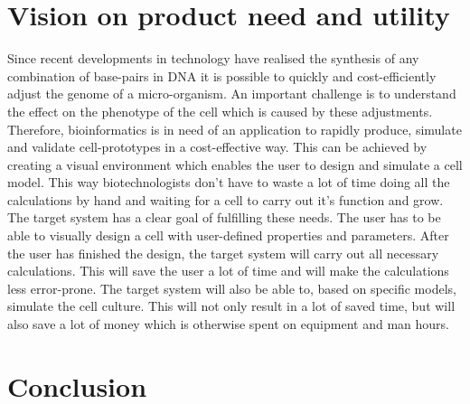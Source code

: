 \documentclass[10pt,a4paper]{report}
\begin{document}
	\section{Vision on product need and utility}
		Since recent developments in technology have realised the synthesis of any combination of base-pairs in DNA it is possible to quickly and cost-efficiently adjust the genome of a micro-organism. An important challenge is to understand the effect on the phenotype of the cell which is caused by these adjustments.\\		
		Therefore, bioinformatics is in need of an application to rapidly produce, simulate and validate cell-prototypes in a cost-effective way. This can be achieved by creating a visual environment which enables the user to design and simulate a cell model. This way biotechnologists don't have to waste a lot of time doing all the calculations by hand and waiting for a cell to carry out it's function and grow.\\
		The target system has a clear goal of fulfilling these needs. The user has to be able to visually design a cell with user-defined properties and parameters. After the user has finished the design, the target system will carry out all necessary calculations. This will save the user a lot of time and will make the calculations less error-prone. The target system will also be able to, based on specific models, simulate the cell culture. This will not only result in a lot of saved time, but will also save a lot of money which is otherwise spent on equipment and man hours.\\
		
	\section{Conclusion}
	
	
\end{document}
